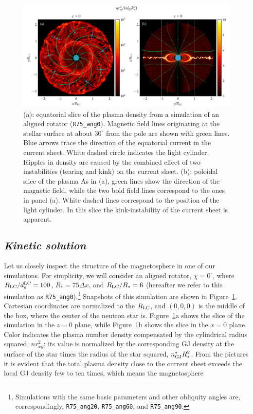 \begin{figure}[htb]
\centering
\includegraphics[width=\columnwidth]{figures/ch3-pulsar/fig2.pdf}
\caption{(a): equatorial slice of the plasma density from a simulation of an aligned rotator (\texttt{R75\_ang0}). Magnetic field lines originating at the stellar surface at about $30^\circ$ from the pole are shown with green lines. Blue arrows trace the direction of the equatorial current in the current sheet. White dashed circle indicates the light cylinder. Ripples in density are caused by the combined effect of two instabilities (tearing and kink) on the current sheet. (b): poloidal slice of the plasma  As in (a), green lines show the direction of the magnetic field, while the two bold field lines correspond to the ones in panel (a). White dashed lines correspond to the position of the light cylinder. In this slice the kink-instability of the current sheet is apparent.}
\label{fig:psr-pulsarslice}
\end{figure}

\subsection*{\small\it Kinetic solution}
\label{psr:sub_kinetic_sol}

Let us closely inspect the structure of the magnetosphere in one of our simulations. For simplicity, we will consider an aligned rotator, $\chi=0^\circ$, where $R_{\rm LC} / d_e^{\rm LC} = 100$, $R_* = 75\Delta x$, and $R_{\rm LC} / R_* = 6$ (hereafter we refer to this simulation as \texttt{R75\_ang0}).\footnote{Simulations with the same basic parameters and other obliquity angles are, correspondingly, \texttt{R75\_ang20}, \texttt{R75\_ang60}, and \texttt{R75\_ang90}.} Snapshots of this simulation are shown in Figure~\ref{fig:psr-pulsarslice}. Cartesian coordinates are normalized to the $R_{\rm LC}$, and $(0, 0, 0)$ is the middle of the box, where the center of the neutron star is. Figure~\ref{fig:psr-pulsarslice}a shows the slice of the simulation in the $z=0$ plane, while Figure~\ref{fig:psr-pulsarslice}b shows the slice in the $x=0$ plane. Color indicates the plasma number density compensated by the cylindrical radius squared, $n r_{xy}^2$; its value is normalized by the corresponding GJ density at the surface of the star times the radius of the star squared, $n_{\rm GJ}^* R_*^2$. From the pictures it is evident that the total plasma density close to the current sheet exceeds the local GJ density few to ten times, which means the magnetosphere 

